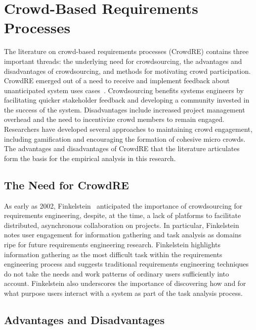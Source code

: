 \section{Crowd-Based Requirements Processes}

The literature on crowd-based requirements processes (CrowdRE) contains three important threads: the underlying need for crowdsourcing, the advantages and disadvantages of crowdsourcing, and methods for motivating crowd participation. CrowdRE emerged out of a need to receive and implement feedback about unanticipated system uses cases~\cite{groen}. Crowdsourcing benefits systems engineers by facilitating quicker stakeholder feedback and developing a community invested in the success of the system. Disadvantages include increased project management overhead and the need to incentivize crowd members to remain engaged. Researchers have developed several approaches to maintaining crowd engagement, including gamification and encouraging the formation of cohesive micro crowds. The advantages and disadvantages of CrowdRE that the literature articulates form the basis for the empirical analysis in this research.

\subsection{The Need for CrowdRE}

As early as 2002, Finkelstein~\cite{finkelstein} anticipated the importance of crowdsourcing for requirements engineering, despite, at the time, a lack of platforms to facilitate distributed, asynchronous collaboration on projects. In particular, Finkelstein notes user engagement for information gathering and task analysis as domains ripe for future requirements engineering research. Finkelstein highlights information gathering as the most difficult task within the requirements engineering process and suggests traditional requirements engineering techniques do not take the needs and work patterns of ordinary users sufficiently into account. Finkelstein also underscores the importance of discovering how and for what purpose users interact with a system as part of the task analysis process.

\subsection{Advantages and Disadvantages}
 
